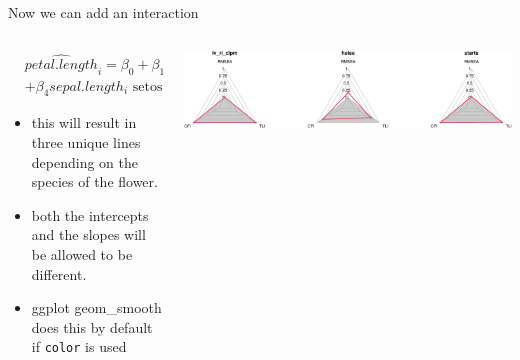 \documentclass[australian,ignorenonframetext,aspectratio=169]{beamer}
\providecommand{\tightlist}{%
  \setlength{\itemsep}{0pt}\setlength{\parskip}{0pt}}
\begin{document}
\begin{frame}[fragile]{Now we can add an interaction}
\protect\hypertarget{now-we-can-add-an-interaction-1}{}

\begin{columns}[T]
\begin{column}{0.5\textwidth}
\tiny

\[
\begin{aligned}
&\widehat{petal.length}_i = \beta_0 + \beta_1 sepal.length_i + \beta_2 \text { setosa }_i + \beta_3 \text { versicolor }_i \\
&+ \beta_4 sepal.length_i \text { setosa }_i + \beta_5 sepal.length_i \text { versicolor }_i
\end{aligned}
\]

\begin{itemize}
\tightlist
\item
  this will result in three unique lines depending on the species of the
  flower.
\item
  both the intercepts and the slopes will be allowed to be different.
\item
  ggplot geom\_smooth does this by default if \texttt{color} is used
\end{itemize}
\end{column}

\begin{column}{0.5\textwidth}
\includegraphics{../graphs/unnamed-chunk-8-1.pdf}
\end{column}
\end{columns}

\end{frame}
\end{document}

